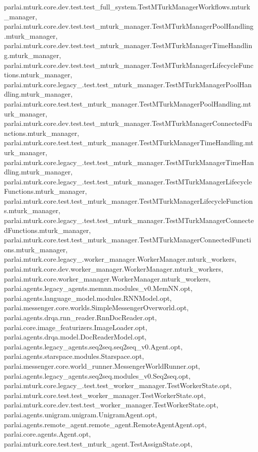 parlai.\+mturk.\+core.\+dev.\+test.\+test\+\_\+full\+\_\+system.\+Test\+M\+Turk\+Manager\+Workflows.\+mturk\+\_\+manager, parlai.\+mturk.\+core.\+dev.\+test.\+test\+\_\+mturk\+\_\+manager.\+Test\+M\+Turk\+Manager\+Pool\+Handling.\+mturk\+\_\+manager, parlai.\+mturk.\+core.\+dev.\+test.\+test\+\_\+mturk\+\_\+manager.\+Test\+M\+Turk\+Manager\+Time\+Handling.\+mturk\+\_\+manager, parlai.\+mturk.\+core.\+dev.\+test.\+test\+\_\+mturk\+\_\+manager.\+Test\+M\+Turk\+Manager\+Lifecycle\+Functions.\+mturk\+\_\+manager, parlai.\+mturk.\+core.\+legacy\+\_.\+test.\+test\+\_\+mturk\+\_\+manager.\+Test\+M\+Turk\+Manager\+Pool\+Handling.\+mturk\+\_\+manager, parlai.\+mturk.\+core.\+test.\+test\+\_\+mturk\+\_\+manager.\+Test\+M\+Turk\+Manager\+Pool\+Handling.\+mturk\+\_\+manager, parlai.\+mturk.\+core.\+dev.\+test.\+test\+\_\+mturk\+\_\+manager.\+Test\+M\+Turk\+Manager\+Connected\+Functions.\+mturk\+\_\+manager, parlai.\+mturk.\+core.\+test.\+test\+\_\+mturk\+\_\+manager.\+Test\+M\+Turk\+Manager\+Time\+Handling.\+mturk\+\_\+manager, parlai.\+mturk.\+core.\+legacy\+\_.\+test.\+test\+\_\+mturk\+\_\+manager.\+Test\+M\+Turk\+Manager\+Time\+Handling.\+mturk\+\_\+manager, parlai.\+mturk.\+core.\+legacy\+\_.\+test.\+test\+\_\+mturk\+\_\+manager.\+Test\+M\+Turk\+Manager\+Lifecycle\+Functions.\+mturk\+\_\+manager, parlai.\+mturk.\+core.\+test.\+test\+\_\+mturk\+\_\+manager.\+Test\+M\+Turk\+Manager\+Lifecycle\+Functions.\+mturk\+\_\+manager, parlai.\+mturk.\+core.\+legacy\+\_.\+test.\+test\+\_\+mturk\+\_\+manager.\+Test\+M\+Turk\+Manager\+Connected\+Functions.\+mturk\+\_\+manager, parlai.\+mturk.\+core.\+test.\+test\+\_\+mturk\+\_\+manager.\+Test\+M\+Turk\+Manager\+Connected\+Functions.\+mturk\+\_\+manager, parlai.\+mturk.\+core.\+legacy\+\_.\+worker\+\_\+manager.\+Worker\+Manager.\+mturk\+\_\+workers, parlai.\+mturk.\+core.\+dev.\+worker\+\_\+manager.\+Worker\+Manager.\+mturk\+\_\+workers, parlai.\+mturk.\+core.\+worker\+\_\+manager.\+Worker\+Manager.\+mturk\+\_\+workers, parlai.\+agents.\+legacy\+\_\+agents.\+memnn.\+modules\+\_\+v0.\+Mem\+N\+N.\+opt, parlai.\+agents.\+language\+\_\+model.\+modules.\+R\+N\+N\+Model.\+opt, parlai.\+messenger.\+core.\+worlds.\+Simple\+Messenger\+Overworld.\+opt, parlai.\+agents.\+drqa.\+rnn\+\_\+reader.\+Rnn\+Doc\+Reader.\+opt, parlai.\+core.\+image\+\_\+featurizers.\+Image\+Loader.\+opt, parlai.\+agents.\+drqa.\+model.\+Doc\+Reader\+Model.\+opt, parlai.\+agents.\+legacy\+\_\+agents.\+seq2seq.\+seq2seq\+\_\+v0.\+Agent.\+opt, parlai.\+agents.\+starspace.\+modules.\+Starspace.\+opt, parlai.\+messenger.\+core.\+world\+\_\+runner.\+Messenger\+World\+Runner.\+opt, parlai.\+agents.\+legacy\+\_\+agents.\+seq2seq.\+modules\+\_\+v0.\+Seq2seq.\+opt, parlai.\+mturk.\+core.\+legacy\+\_.\+test.\+test\+\_\+worker\+\_\+manager.\+Test\+Worker\+State.\+opt, parlai.\+mturk.\+core.\+test.\+test\+\_\+worker\+\_\+manager.\+Test\+Worker\+State.\+opt, parlai.\+mturk.\+core.\+dev.\+test.\+test\+\_\+worker\+\_\+manager.\+Test\+Worker\+State.\+opt, parlai.\+agents.\+unigram.\+unigram.\+Unigram\+Agent.\+opt, parlai.\+agents.\+remote\+\_\+agent.\+remote\+\_\+agent.\+Remote\+Agent\+Agent.\+opt, parlai.\+core.\+agents.\+Agent.\+opt, parlai.\+mturk.\+core.\+test.\+test\+\_\+mturk\+\_\+agent.\+Test\+Assign\+State.\+opt, 